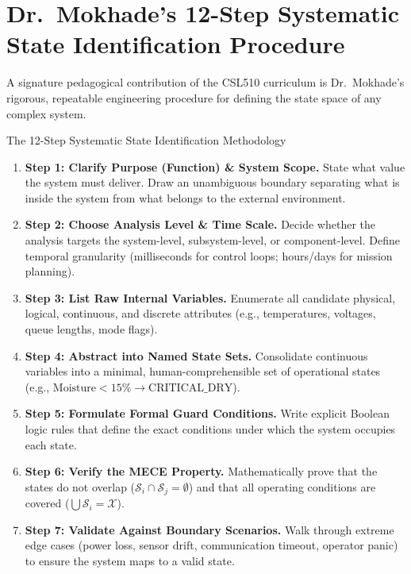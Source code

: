 \section{Dr.~Mokhade's 12-Step Systematic State Identification Procedure}
\label{sec:twelve_step_state}

A signature pedagogical contribution of the CSL510 curriculum is Dr.~Mokhade's rigorous, repeatable engineering procedure for defining the state space of any complex system.

\begin{checklistbox}{The 12-Step Systematic State Identification Methodology}
\begin{enumerate}[leftmargin=2em, itemsep=3pt]
    \item \textbf{Step 1: Clarify Purpose (Function) \& System Scope.} State what value the system must deliver. Draw an unambiguous boundary separating what is inside the system from what belongs to the external environment.
    \item \textbf{Step 2: Choose Analysis Level \& Time Scale.} Decide whether the analysis targets the system-level, subsystem-level, or component-level. Define temporal granularity (milliseconds for control loops; hours/days for mission planning).
    \item \textbf{Step 3: List Raw Internal Variables.} Enumerate all candidate physical, logical, continuous, and discrete attributes (e.g., temperatures, voltages, queue lengths, mode flags).
    \item \textbf{Step 4: Abstract into Named State Sets.} Consolidate continuous variables into a minimal, human-comprehensible set of operational states (e.g., $\text{Moisture} < 15\% \to \text{CRITICAL\_DRY}$).
    \item \textbf{Step 5: Formulate Formal Guard Conditions.} Write explicit Boolean logic rules that define the exact conditions under which the system occupies each state.
    \item \textbf{Step 6: Verify the MECE Property.} Mathematically prove that the states do not overlap ($\mathcal{S}_i \cap \mathcal{S}_j = \emptyset$) and that all operating conditions are covered ($\bigcup \mathcal{S}_i = \mathcal{X}$).
    \item \textbf{Step 7: Validate Against Boundary Scenarios.} Walk through extreme edge cases (power loss, sensor drift, communication timeout, operator panic) to ensure the system maps to a valid state.

\end{enumerate}
\end{checklistbox}
